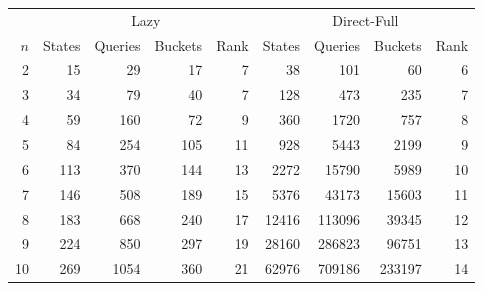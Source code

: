 \begin{tabular}{r rrrr rrrr}
\toprule
 & \multicolumn{4}{c}{Lazy} & \multicolumn{4}{c}{Direct-Full} \\
$n$ & States & Queries & Buckets & Rank & States & Queries & Buckets & Rank \\
\midrule
2 & 15 & 29 & 17 & 7 & 38 & 101 & 60 & 6 \\
3 & 34 & 79 & 40 & 7 & 128 & 473 & 235 & 7 \\
4 & 59 & 160 & 72 & 9 & 360 & 1720 & 757 & 8 \\
5 & 84 & 254 & 105 & 11 & 928 & 5443 & 2199 & 9 \\
6 & 113 & 370 & 144 & 13 & 2272 & 15790 & 5989 & 10 \\
7 & 146 & 508 & 189 & 15 & 5376 & 43173 & 15603 & 11 \\
8 & 183 & 668 & 240 & 17 & 12416 & 113096 & 39345 & 12 \\
9 & 224 & 850 & 297 & 19 & 28160 & 286823 & 96751 & 13 \\
10 & 269 & 1054 & 360 & 21 & 62976 & 709186 & 233197 & 14 \\
\bottomrule
\end{tabular}

